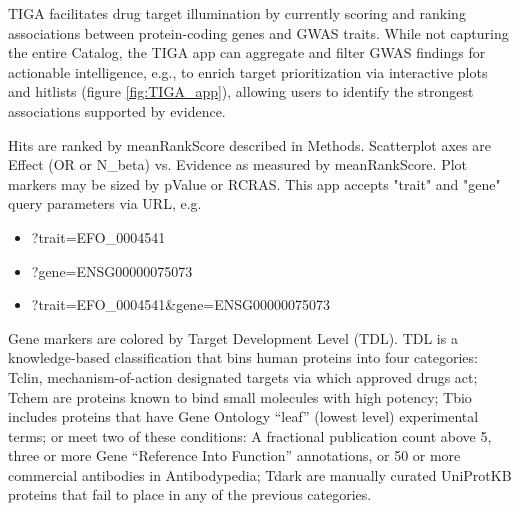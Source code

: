 TIGA facilitates drug target illumination by currently scoring and ranking associations between protein-coding genes and GWAS traits. While not capturing the entire Catalog, the TIGA app can aggregate and filter GWAS findings for actionable intelligence, e.g., to enrich target prioritization via interactive plots and hitlists (figure \ref{fig:TIGA_app}), allowing users to identify the strongest associations supported by evidence.

Hits are ranked by meanRankScore described in Methods. Scatterplot axes are Effect (OR or N\_beta) vs. Evidence as measured by meanRankScore. Plot markers may be sized by pValue or RCRAS. This app accepts "trait" and "gene" query parameters via URL, e.g.
\begin{singlespace}
\begin{itemize}
\item ?trait=EFO\_0004541
\item ?gene=ENSG00000075073
\item ?trait=EFO\_0004541\&gene=ENSG00000075073
\end{itemize}
\end{singlespace}
Gene markers are colored by Target Development Level (TDL)\cite{Oprea2018-cp}. TDL is a knowledge-based classification that bins human proteins into four categories: Tclin, mechanism-of-action designated targets via which approved drugs act\cite{Santos2017-sd,Ursu2019-hx,Avram2020-ff}; Tchem are proteins known to bind small molecules with high potency; Tbio includes proteins that have Gene Ontology\cite{Ashburner2000-aw} “leaf” (lowest level) experimental terms; or meet two of these conditions:  A fractional publication count\cite{Pafilis2013-ml} above 5, three or more Gene “Reference Into Function” annotations\cite{Mitchell2003-ty}, or 50 or more commercial antibodies in Antibodypedia\cite{Bjorling2008-ia}; Tdark are manually curated UniProtKB proteins that fail to place in any of the previous categories.


